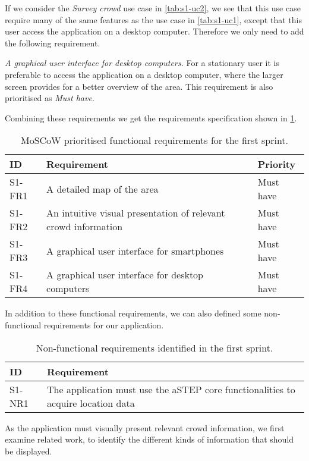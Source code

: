 If we consider the \emph{Survey crowd} use case in \cref{tab:s1-uc2}, we see that this use case require many of the same features as the use case in \cref{tab:s1-uc1}, except that this user access the application on a desktop computer. Therefore we only need to add the following requirement.

\emph{A graphical user interface for desktop computers.} For a stationary user it is preferable to access the application on a desktop computer, where the larger screen provides for a better overview of the area. This requirement is also prioritised as \emph{Must have}.

Combining these requirements we get the requirements specification shown in \cref{tab:s1_req}.

\begin{table}[h!]
	\centering
	\begin{tabularx}{\textwidth}{lXl}
		\toprule
		\textbf{ID} & \textbf{Requirement} & \textbf{Priority} \\
		\midrule 
		\rowcolor[HTML]{EFEFEF} 
		S1-FR1 & A detailed map of the area & Must have \\
		S1-FR2 & An intuitive visual presentation of relevant crowd information & Must have \\
		\rowcolor[HTML]{EFEFEF} 
		S1-FR3 & A graphical user interface for smartphones & Must have \\
		S1-FR4 & A graphical user interface for desktop computers & Must have \\
		\bottomrule
	\end{tabularx}
	\caption{MoSCoW prioritised functional requirements for the first sprint.}
	\label{tab:s1_req}
\end{table}

In addition to these functional requirements, we can also defined some non-functional requirements for our application.

\begin{table}[h!]
	\centering
	\begin{tabularx}{\textwidth}{lX}
		\toprule
		\textbf{ID} & \textbf{Requirement} \\
		\midrule 
		\rowcolor[HTML]{EFEFEF} 
		S1-NR1 & The application must use the aSTEP core functionalities to acquire location data \\
		\bottomrule
	\end{tabularx}
	\caption{Non-functional requirements identified in the first sprint.}
	\label{tab:s1_nreqs}
\end{table}

As the application must visually present relevant crowd information, we first examine related work, to identify the different kinds of information that should be displayed.
